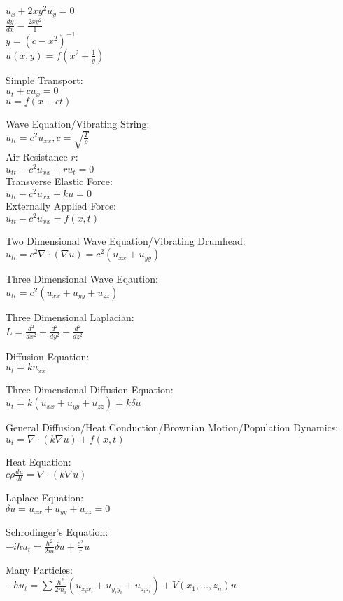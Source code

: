$u_x+2xy^2u_y=0$ \\
$\frac{dy}{dx}=\frac{2xy^2}{1}$ \\
$y=(c-x^2)^{-1}$ \\
$u(x,y)=f \left(x^2+\frac{1}{y} \right)$

Simple Transport: \\
$u_t+cu_x=0$ \\
$u=f(x-ct)$

Wave Equation/Vibrating String: \\
$u_{tt}=c^2u_{xx}, c=\sqrt{\frac{T}{\rho}}$ \\
Air Resistance $r$: \\
$u_{tt}-c^2u_{xx}+ru_t=0$ \\
Transverse Elastic Force: \\
$u_{tt}-c^2u_{xx}+ku=0$ \\
Externally Applied Force: \\
$u_{tt}-c^2u_{xx}=f(x,t)$

Two Dimensional Wave Equation/Vibrating Drumhead: \\
$u_{tt}=c^2 \nabla \cdot (\nabla u)=c^2(u_{xx}+u_{yy})$

Three Dimensional Wave Eqaution: \\
$u_{tt}=c^2(u_{xx}+u_{yy}+u_{zz})$

Three Dimensional Laplacian: \\
$L=\frac{d^2}{dx^2}+\frac{d^2}{dy^2}+\frac{d^2}{dz^2}$

Diffusion Equation: \\
$u_t=ku_{xx}$

Three Dimensional Diffusion Equation: \\
$u_t=k(u_{xx}+u_{yy}+u_{zz})=k \delta u$

General Diffusion/Heat Conduction/Brownian Motion/Population Dynamics: \\
$u_t=\nabla \cdot (k \nabla u)+f(x,t)$

Heat Equation: \\
$c\rho \frac{du}{dt}=\nabla \cdot (k \nabla u)$

Laplace Equation: \\
$\delta u=u_{xx}+u_{yy}+u_{zz}=0$

Schrodinger's Equation: \\
$-ihu_t = \frac{h^2}{2m} \delta u+\frac{e^2}{r} u$

Many Particles: \\
$-hu_t = \sum \frac{h^2}{2m_i}(u_{x_i x_i}+u_{y_i y_i}+u_{z_i z_i})+V(x_1,\dots,z_n)u$

